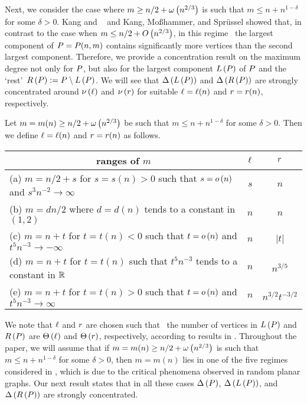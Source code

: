 Next, we consider the case where $m\geq n/2+\omega\left(n^{2/3}\right)$ is such that $m\leq n+n^{1-\delta}$ for some $\delta>0$. Kang and \Luczak\ \cite{KangLuczak2012} and Kang, Moßhammer, and Sprüssel \cite{KangMosshammerSpruessel2020} showed that, in contrast to the case when $m\leq n/2+O\left(n^{2/3}\right)$, in this regime \whp\ the largest component of $P=P(n,m)$ contains significantly more vertices than the second largest component. Therefore, we provide a concentration result on the maximum degree not only for $P$, but also for the largest component $L\left(P\right)$ of $P$ and the \lq rest\rq\ $R\left(P\right):=P\setminus L\left(P\right)$. We will see that $\Delta\left(L\left(P\right)\right)$ and $\Delta\left(R\left(P\right)\right)$ are strongly concentrated around $\nu\left(\ell\right)$ and $\nu\left(r\right)$ for suitable $\ell=\ell(n)$ and $r=r(n)$, respectively. 

\begin{definition}\label{MDdef:functionLR}
Let $m=m(n)\geq n/2+\omega\left(n^{2/3}\right)$ be such that $m\leq n+n^{1-\delta}$ for some $\delta>0$. Then we define $\ell=\ell(n)$ and $r=r(n)$ as follows.	
\begin{center}
	\def\arraystretch{1.25}
	\begin{tabular}{l|c c }
	 \multicolumn{1}{c|}{ranges of $m$}	& $\ell$ & $r$
		\\
		\hline
		(a) $m=n/2+s$ for $s=s(n)>0$ such that $s=o\left(n\right)$ and $s^3n^{-2}\to \infty$ & $s$ & $n$ \\
		(b) $m=d n/2$ where $d=d(n)$ tends to a constant in $\left(1,2\right)$ & $n$ & $n$ \\
		(c) $m=n+t$ for $t=t(n)<0$ such that $t=o\left(n\right)$ and $t^5n^{-3}\to -\infty$ & $n$ & $\left|t\right|$ \\
		(d) $m=n+t$ for $t=t(n)$ such that $t^5n^{-3}$ tends to a constant in $\mathbb{R}$ & $n$ & $n^{3/5}$ \\
		(e) $m=n+t$ for $t=t(n)>0$ such that $t=o\left(n\right)$ and $t^5n^{-3}\to \infty$ & $n$ & $n^{3/2}t^{-3/2}$\hspace{-0.05cm}
	\end{tabular}
\end{center}
\end{definition}

We note that $\ell$ and $r$ are chosen such that \whp\ the number of vertices in $L\left(P\right)$ and $R\left(P\right)$ are $\Theta\left(\ell\right)$ and $\Theta\left(r\right)$, respectively, according to results in \cite{KangMosshammerSpruessel2020,KangLuczak2012}. Throughout the paper, we will assume that if $m=m(n)\geq n/2+\omega\left(n^{2/3}\right)$ is such that $m\leq n+n^{1-\delta}$ for some $\delta>0$, then $m=m(n)$ lies in one of the five regimes considered in , which is due to the critical phenomena observed in random planar graphs. Our next result states that in all these cases $\Delta\left(P\right)$, $\Delta\left(L\left(P\right)\right)$, and $\Delta\left(R\left(P\right)\right)$ are strongly concentrated. 

